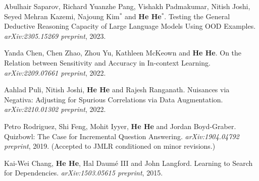 Abulhair Saparov, Richard Yuanzhe Pang, Vishakh Padmakumar, Nitish Joshi, Seyed Mehran Kazemi, Najoung Kim$^*$ and \textbf{He He}$^*$. Testing the General Deductive Reasoning Capacity of Large Language Models Using OOD Examples. \textit{arXiv:2305.15269 preprint}, 2023.

Yanda Chen, Chen Zhao, Zhou Yu, Kathleen McKeown and \textbf{He He}. On the Relation between Sensitivity and Accuracy in In-context Learning. \textit{arXiv:2209.07661 preprint}, 2022.

Aahlad Puli, Nitish Joshi, \textbf{He He} and Rajesh Ranganath. Nuisances via Negativa: Adjusting for Spurious Correlations via Data Augmentation. \textit{arXiv:2210.01302 preprint}, 2022.

Petro Rodriguez, Shi Feng, Mohit Iyyer, \textbf{He He} and Jordan Boyd-Graber. Quizbowl: The Case for Incremental Question Answering. \textit{arXiv:1904.04792 preprint}, 2019. (Accepted to JMLR conditioned on minor revisions.)

Kai-Wei Chang, \textbf{He He}, Hal Daum\'e III and John Langford. Learning to Search for Dependencies. \textit{arXiv:1503.05615 preprint}, 2015.

